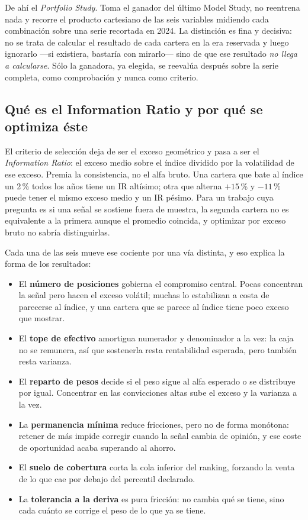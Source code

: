 De ahí el \emph{Portfolio Study}. Toma el ganador del último Model Study, no reentrena nada y
recorre el producto cartesiano de las seis variables midiendo cada combinación sobre una serie
recortada en 2024. La distinción es fina y decisiva: no se trata de calcular el resultado
de cada cartera en la era reservada y luego ignorarlo ---si existiera, bastaría con mirarlo--- sino
de que ese resultado \emph{no llega a calcularse}. Sólo la ganadora, ya elegida, se reevalúa después
sobre la serie completa, como comprobación y nunca como criterio.

\subsection{Qué es el Information Ratio y por qué se optimiza éste}

El criterio de selección deja de ser el exceso geométrico y pasa a ser el \emph{Information Ratio}:
el exceso medio sobre el índice dividido por la volatilidad de ese exceso. Premia la
consistencia, no el alfa bruto. Una cartera que bate al índice un 2\,\% todos los años
tiene un IR altísimo; otra que alterna $+15$\,\% y $-11$\,\% puede tener el mismo exceso medio y un
IR pésimo. Para un trabajo cuya pregunta es si una señal se sostiene fuera de muestra, la segunda
cartera no es equivalente a la primera aunque el promedio coincida, y optimizar por exceso bruto no
sabría distinguirlas.

Cada una de las seis mueve ese cociente por una vía distinta, y eso explica la forma de los
resultados:

\begin{itemize}
  \item El \textbf{número de posiciones} gobierna el compromiso central. Pocas concentran la señal
  pero hacen el exceso volátil; muchas lo estabilizan a costa de parecerse al índice, y una cartera
  que se parece al índice tiene poco exceso que mostrar.
  \item El \textbf{tope de efectivo} amortigua numerador y denominador a la vez: la caja no se
  remunera, así que sostenerla resta rentabilidad esperada, pero también resta varianza.
  \item El \textbf{reparto de pesos} decide si el peso sigue al alfa esperado o se distribuye por
  igual. Concentrar en las convicciones altas sube el exceso y la varianza a la vez.
  \item La \textbf{permanencia mínima} reduce fricciones, pero no de forma monótona: retener de más
  impide corregir cuando la señal cambia de opinión, y ese coste de oportunidad acaba superando al
  ahorro.
  \item El \textbf{suelo de cobertura} corta la cola inferior del ranking, forzando la venta de lo
  que cae por debajo del percentil declarado.
  \item La \textbf{tolerancia a la deriva} es pura fricción: no cambia qué se tiene, sino cada
  cuánto se corrige el peso de lo que ya se tiene.
\end{itemize}

